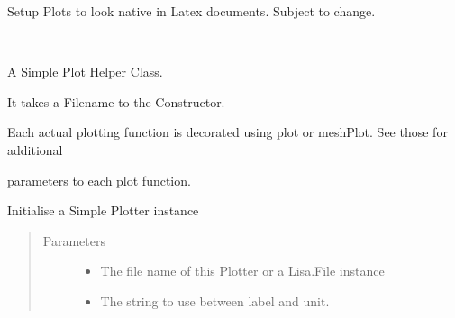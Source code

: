 \documentclass[letterpaper,10pt,openany,oneside,english]{sphinxmanual}
\begin{document}

\begin{fulllineitems}
\label{\detokenize{plots:plots.Deprecated}}
\end{fulllineitems}



\begin{fulllineitems}
Setup Plots to look native in Latex documents. Subject to change.

\end{fulllineitems}


\begin{fulllineitems}
\label{\detokenize{plots:plots.SimplePlotter}}~
\begin{DUlineblock}{0em}
\item[] A Simple Plot Helper Class.  
\item[] It takes a Filename to the Constructor.  
\item[] Each actual plotting function is decorated using plot or meshPlot. See those for additional  
\item[] parameters to each plot function.  
\end{DUlineblock}

\begin{fulllineitems}
\label{\detokenize{plots:plots.SimplePlotter.__init__}}
Initialise a Simple Plotter instance
\begin{quote}\begin{description}
\item[{Parameters}] \leavevmode\begin{itemize}
\item {} 
 \textendash{} The file name of this Plotter or a Lisa.File instance

\item {} 
 \textendash{} The string to use between label and unit.

\end{itemize}


\end{description}
\end{quote}
\end{fulllineitems}
\end{fulllineitems}
\end{document}
